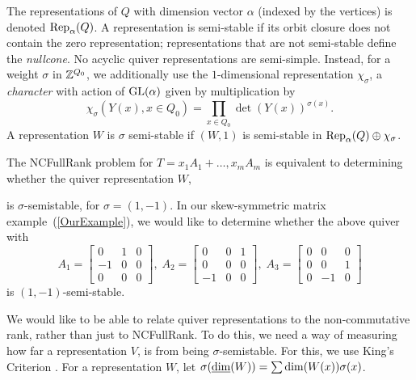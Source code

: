 The representations of $Q$ with dimension vector $\alpha$ (indexed by the vertices) is denoted $\operatorname{Rep}_\alpha(Q)$. A representation is semi-stable if its orbit closure does not contain the zero representation; representations that are not semi-stable define the \emph{nullcone}. No acyclic quiver representations are semi-simple. Instead, for a weight $\sigma$ in ${\mathbb Z}^{Q_0}$, we additionally use the $1$-dimensional representation $\chi_\sigma$, a \emph{character} with action of $\operatorname{GL}(\alpha)$ given by multiplication by
$$\chi_\sigma(Y(x),x\in Q_0)=\prod_{x\in Q_0}\det(Y(x))^{\sigma(x)}.$$
A representation $W$ is $\sigma$ semi-stable if $(W,1)$ is semi-stable in $\operatorname{Rep}_\alpha(Q)\oplus \chi_\sigma$.

The NCFullRank problem for $T=x_1A_1+\ldots,x_mA_m$ is equivalent to determining whether the quiver representation $W$,

\begin{center}
\end{center}

is $\sigma$-semistable, for $\sigma=(1,-1)$. In our skew-symmetric matrix example~(\ref{OurExample}), we would like to determine whether the above quiver with
$$A_1=\begin{bmatrix}
0 & 1 & 0\\ 
-1 & 0 & 0\\ 
0 & 0 & 0
\end{bmatrix}\!,\; A_2=\begin{bmatrix}
0 & 0 & 1\\ 
0 & 0 & 0\\ 
-1 & 0 & 0
\end{bmatrix}\!,\; A_3=\begin{bmatrix}
0 & 0 & 0\\ 
0 & 0 & 1\\ 
0 & -1 & 0
\end{bmatrix}$$
is $(1,-1)$-semi-stable.

We would like to be able to relate quiver representations to the non-commutative rank, rather than just to NCFullRank. To do this, we need a way of measuring how far a representation $V$, is from being $\sigma$-semistable. For this, we use King's Criterion \cite{King94}. For a representation $W$, let $\sigma(\underline{\rm dim}(W))=\sum \dim(W(x))\sigma(x)$.

